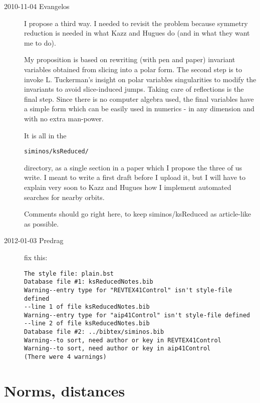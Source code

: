 

\begin{description}

\item[2010-11-04 Evangelos]
I propose a third way. I needed to revisit the problem because symmetry
reduction is needed in what Kazz and Hugues do (and in what they want me
to do).

My proposition is based on rewriting (with pen and paper) invariant
variables obtained from slicing into a polar form. The second step is to
invoke L. Tuckerman's insight on polar variables singularities to modify
the invariants to avoid slice-induced jumps. Taking care of reflections
is the final step. Since there is no computer algebra used, the final
variables have a simple form which can be easily used in numerics - in
any dimension and with no extra man-power.

It is all in the
\begin{verbatim}
siminos/ksReduced/
\end{verbatim}
 directory, as a single section in a paper
which I propose the three of us write. I meant to write a first
draft before I upload it, but I will have to explain very soon to Kazz
and Hugues how I implement automated searches for nearby orbits.

Comments should go right here, to keep siminos/ksReduced as
article-like as possible.

\item[2012-01-03 Predrag] fix this:
\begin{verbatim}
The style file: plain.bst
Database file #1: ksReducedNotes.bib
Warning--entry type for "REVTEX41Control" isn't style-file defined
--line 1 of file ksReducedNotes.bib
Warning--entry type for "aip41Control" isn't style-file defined
--line 2 of file ksReducedNotes.bib
Database file #2: ../bibtex/siminos.bib
Warning--to sort, need author or key in REVTEX41Control
Warning--to sort, need author or key in aip41Control
(There were 4 warnings)
\end{verbatim}


\end{description}

\section{Norms, distances}

